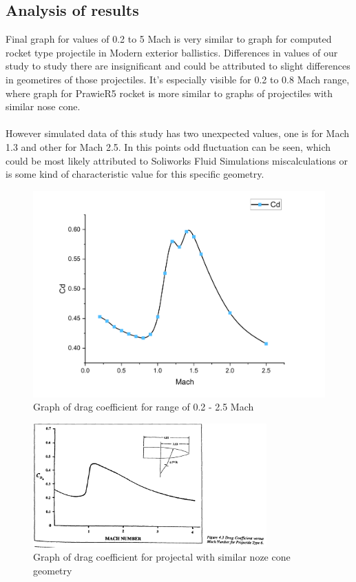 \documentclass{article}
\begin{document}
\subsection{Analysis of results}
Final graph for values of 0.2 to 5 Mach is very similar to graph for computed rocket type projectile in Modern exterior ballistics\cite{MEB}. Differences in values of our study to study there are insignificant and could be attributed to slight differences in geometires of those projectiles. It's especially visible for 0.2 to 0.8 Mach range, where graph for PrawieR5 rocket is more similar to graphs of projectiles with similar nose cone. \\\\
However simulated data of this study has two unexpected values, one is for Mach 1.3 and other for Mach 2.5. In this points odd fluctuation can be seen, which could be most likely attributed to Soliworks Fluid Simulations miscalculations or is some kind of characteristic value for this specific geometry.
\begin{figure}[H]
\centering
\includegraphics[width=\textwidth]{CD25}
\caption{Graph of drag coefficient for range of 0.2 - 2.5 Mach}
\label{fig:CD25}
\end{figure}

\begin{figure}[H]
\centering
\includegraphics[width=0.8\textwidth]{MEBgraphNOZECONE}
\caption{Graph of drag coefficient for projectal with similar noze cone geometry\cite{MEB}}
\label{fig:MEBgraphNOZECONE}
\end{figure}
\end{document}
